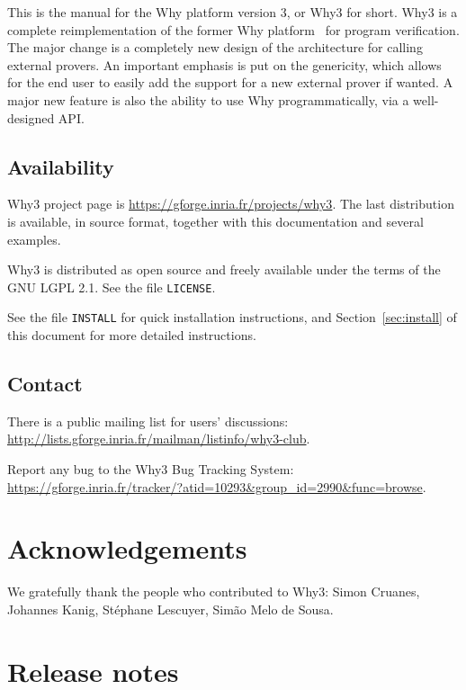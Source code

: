 \documentclass[a4paper,11pt,twoside,openright]{memoir}
\begin{document}
This is the manual for the Why platform version 3, or Why3 for
short. Why3 is a complete reimplementation of the former Why
platform~\cite{filliatre07cav} for program verification.  The major
change is a completely new design of the architecture for calling
external provers. An important emphasis is put on the genericity,
which allows for the end user to easily add the support for a new
external prover if wanted.  A major new feature is also the ability
to use Why programmatically, via a well-designed API.


\subsection*{Availability}

Why3 project page is \url{https://gforge.inria.fr/projects/why3}.  The
last distribution is available, in source format, together with this
documentation and several examples.

Why3 is distributed as open source and freely available under the
terms of the GNU LGPL 2.1. See the file \texttt{LICENSE}.

See the file \texttt{INSTALL} for quick installation instructions, and
Section~\ref{sec:install} of this document for more detailed
instructions.

\subsection*{Contact}

There is a public mailing list for users' discussions:
\url{http://lists.gforge.inria.fr/mailman/listinfo/why3-club}.

Report any bug to the Why3 Bug Tracking System:
\url{https://gforge.inria.fr/tracker/?atid=10293&group_id=2990&func=browse}.


\section*{Acknowledgements}

We gratefully thank the people who contributed to Why3: Simon Cruanes,
Johannes Kanig, St\'ephane Lescuyer, Sim\~ao Melo de Sousa.

\section*{Release notes}
\end{document}
